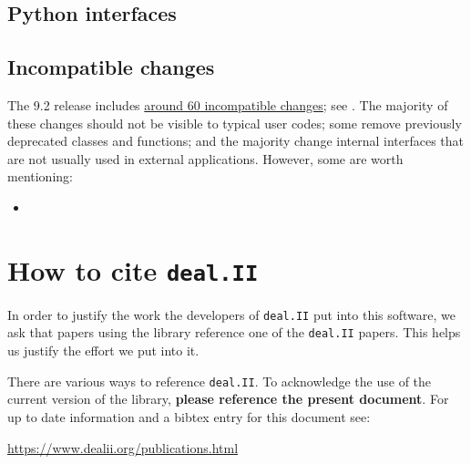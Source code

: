 \documentclass{ansarticle-preprint}
\newcommand{\specialword}[1]{\texttt{#1}}
\newcommand{\dealii}{{\specialword{deal.II}}\xspace}
\begin{document}


\subsection{Python interfaces}
\label{subsec:python}





\subsection{Incompatible changes}

The 9.2 release includes
\href{https://dealii.org/developer/doxygen/deal.II/changes_between_9_1_1_and_9_2_0.html}
     {around 60 incompatible changes}; see \cite{changes92}. The majority of these changes
should not be visible to typical user codes; some remove previously
deprecated classes and functions; and the majority change internal
interfaces that are not usually used in external
applications. However, some are worth mentioning:
\begin{itemize}
\item
\end{itemize}



\section{How to cite \dealii}\label{sec:cite}

In order to justify the work the developers of \dealii put into this
software, we ask that papers using the library reference one of the
\dealii papers. This helps us justify the effort we put into it.

There are various ways to reference \dealii. To acknowledge the use of
the current version of the library, \textbf{please reference the present
document}. For up to date information and a bibtex entry for this document
see:
\begin{center}
 \url{https://www.dealii.org/publications.html}
\end{center}
\end{document}
